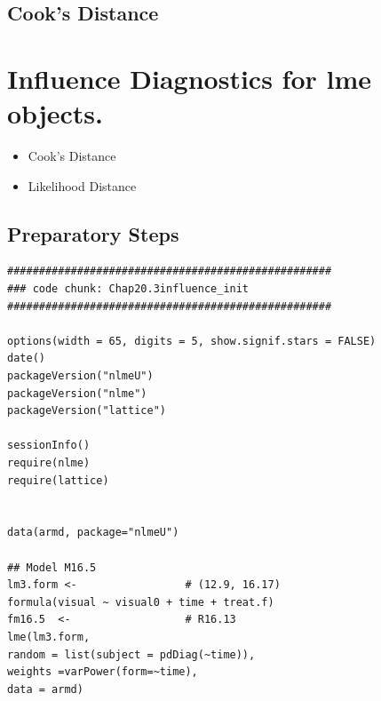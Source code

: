 \documentclass[a4paper,12pt]{article}
\begin{document}
\subsection{Cook's Distance}



\section{Influence Diagnostics for lme objects.}

\begin{itemize}
\item Cook's Distance
\item Likelihood Distance
\end{itemize}

\subsection{Preparatory Steps}

\begin{framed}
\begin{verbatim}
###################################################
### code chunk: Chap20.3influence_init
###################################################

options(width = 65, digits = 5, show.signif.stars = FALSE)
date()
packageVersion("nlmeU")
packageVersion("nlme")
packageVersion("lattice")

sessionInfo()
require(nlme)    
require(lattice) 


data(armd, package="nlmeU")

## Model M16.5 
lm3.form <-                 # (12.9, 16.17)
formula(visual ~ visual0 + time + treat.f) 
fm16.5  <-                  # R16.13
lme(lm3.form,              
random = list(subject = pdDiag(~time)),       
weights =varPower(form=~time),
data = armd)       
\end{verbatim}
\end{framed}
\end{document}
